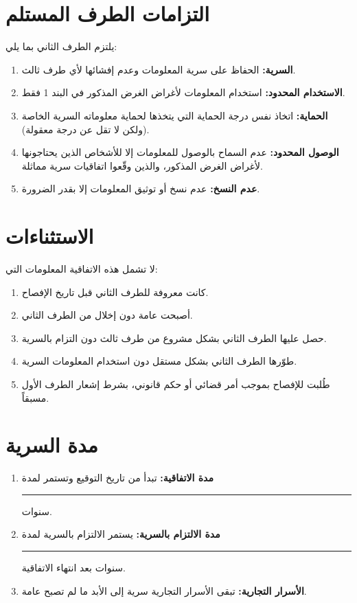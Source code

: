 \documentclass[12pt,a4paper]{article}
\begin{document}
\section{التزامات الطرف المستلم}
\label{sec:obligations}
يلتزم الطرف الثاني بما يلي:
\begin{enumerate}
    \item \textbf{السرية:} الحفاظ على سرية المعلومات وعدم إفشائها لأي طرف ثالث.
    \item \textbf{الاستخدام المحدود:} استخدام المعلومات لأغراض الغرض المذكور في البند 1 فقط.
    \item \textbf{الحماية:} اتخاذ نفس درجة الحماية التي يتخذها لحماية معلوماته السرية الخاصة (ولكن لا تقل عن درجة معقولة).
    \item \textbf{الوصول المحدود:} عدم السماح بالوصول للمعلومات إلا للأشخاص الذين يحتاجونها لأغراض الغرض المذكور، والذين وقّعوا اتفاقيات سرية مماثلة.
    \item \textbf{عدم النسخ:} عدم نسخ أو توثيق المعلومات إلا بقدر الضرورة.
\end{enumerate}

\section{الاستثناءات}
\label{sec:exclusions}
لا تشمل هذه الاتفاقية المعلومات التي:
\begin{enumerate}
    \item كانت معروفة للطرف الثاني قبل تاريخ الإفصاح.
    \item أصبحت عامة دون إخلال من الطرف الثاني.
    \item حصل عليها الطرف الثاني بشكل مشروع من طرف ثالث دون التزام بالسرية.
    \item طوّرها الطرف الثاني بشكل مستقل دون استخدام المعلومات السرية.
    \item طُلبت للإفصاح بموجب أمر قضائي أو حكم قانوني، بشرط إشعار الطرف الأول مسبقاً.
\end{enumerate}

\section{مدة السرية}
\label{sec:duration}
\begin{enumerate}
    \item \textbf{مدة الاتفاقية:} تبدأ من تاريخ التوقيع وتستمر لمدة \rule{2cm}{0.4pt} سنوات.
    \item \textbf{مدة الالتزام بالسرية:} يستمر الالتزام بالسرية لمدة \rule{2cm}{0.4pt} سنوات بعد انتهاء الاتفاقية.
    \item \textbf{الأسرار التجارية:} تبقى الأسرار التجارية سرية إلى الأبد ما لم تصبح عامة.
\end{enumerate}
\end{document}
